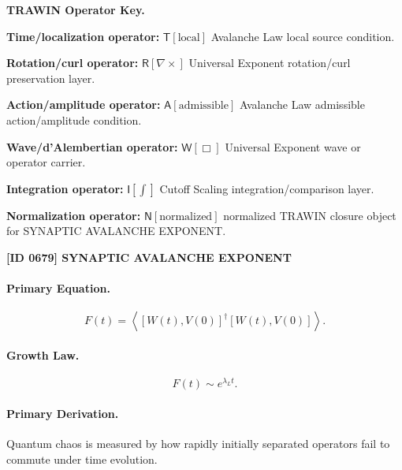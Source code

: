 \par\vspace{0.45\baselineskip}
\noindent\begin{minipage}[t]{\linewidth}
\begingroup
\small
\raggedright
\textbf{TRAWIN Operator Key.}\par
\noindent\textbf{Time/localization operator:} $\mathsf{T}\!\left[\mathrm{local}\right]$ Avalanche Law local source condition.\par
\noindent\textbf{Rotation/curl operator:} $\mathsf{R}\!\left[\nabla\times\right]$ Universal Exponent rotation/curl preservation layer.\par
\noindent\textbf{Action/amplitude operator:} $\mathsf{A}\!\left[\mathrm{admissible}\right]$ Avalanche Law admissible action/amplitude condition.\par
\noindent\textbf{Wave/d'Alembertian operator:} $\mathsf{W}\!\left[\Box\right]$ Universal Exponent wave or operator carrier.\par
\noindent\textbf{Integration operator:} $\mathsf{I}\!\left[\int\right]$ Cutoff Scaling integration/comparison layer.\par
\noindent\textbf{Normalization operator:} $\mathsf{N}\!\left[\mathrm{normalized}\right]$ normalized TRAWIN closure object for SYNAPTIC AVALANCHE EXPONENT.\par
\endgroup
\end{minipage}

\clearpage
\noindent\textbf{[ID 0679] SYNAPTIC AVALANCHE EXPONENT}\par
\vspace{0.35em}
\paragraph{Primary Equation.}
\begin{equation}
F(t)
=
\left\langle
[W(t),V(0)]^\dagger
[W(t),V(0)]
\right\rangle .
\end{equation}

\paragraph{Growth Law.}
\begin{equation}
F(t)\sim e^{\lambda_L t}.
\end{equation}

\paragraph{Primary Derivation.}
Quantum chaos is measured by how rapidly initially separated operators fail to commute under time evolution.

